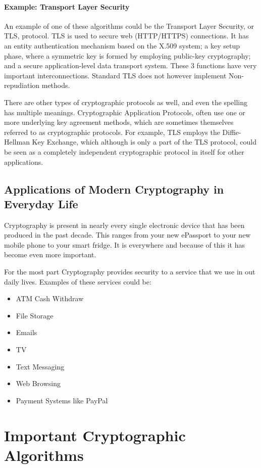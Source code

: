 \paragraph{Example: Transport Layer Security} 
An example of one of these algorithms could be the Transport Layer Security, or TLS, protocol. TLS is used to secure web (HTTP/HTTPS) connections. It has an entity authentication mechanism based on the X.509 system; a key setup phase, where a symmetric key is formed by employing public-key cryptography; and a secure application-level data transport system. These 3 functions have very important interconnections. Standard TLS does not however implement Non-repudiation methods.

There are other types of cryptographic protocols as well, and even the spelling has multiple meanings. Cryptographic Application Protocols, often use one or more underlying key agreement methods, which are sometimes themselves referred to as cryptographic protocols. For example, TLS employs the Diffie-Hellman Key Exchange, which although is only a part of the TLS protocol, could be seen as a completely independent cryptographic protocol in itself for other applications.

\subsection{Applications of Modern Cryptography in Everyday Life}

Cryptography is present in nearly every single electronic device that has been produced in the past decade. This ranges from your new ePassport to your new mobile phone to your smart fridge. It is everywhere and because of this it has become even more important. 

For the most part Cryptography provides security to a service that we use in out daily lives. Examples of these services could be:
\begin{itemize}
\item{ATM Cash Withdraw}
\item{File Storage}
\item{Emails}
\item{TV}
\item{Text Messaging}
\item{Web Browsing}
\item{Payment Systems like PayPal}
\end{itemize}

\section{Important Cryptographic Algorithms}

